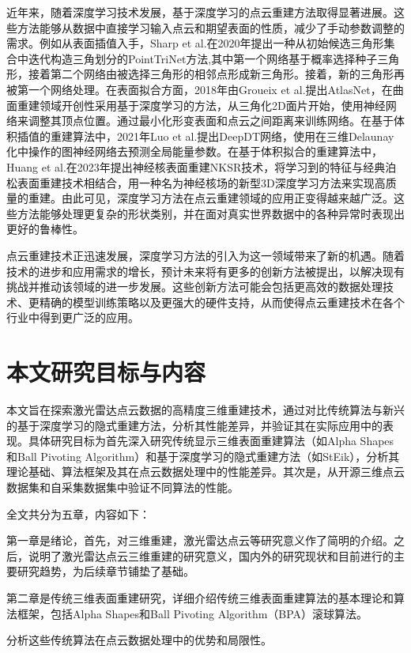 \documentclass{xduugthesis}
\begin{document}
近年来，随着深度学习技术发展，基于深度学习的点云重建方法取得显著进展。这些方法能够从数据中直接学习输入点云和期望表面的性质，减少了手动参数调整的需求。例如从表面插值入手，Sharp et al.在2020年提出一种从初始候选三角形集合中迭代构造三角划分的PointTriNet方法,其中第一个网络基于概率选择种子三角形，接着第二个网络由被选择三角形的相邻点形成新三角形。接着，新的三角形再被第一个网络处理。在表面拟合方面，2018年由Groueix et al.提出AtlasNet，在曲面重建领域开创性采用基于深度学习的方法，从三角化2D面片开始，使用神经网络来调整其顶点位置。通过最小化形变表面和点云之间距离来训练网络。在基于体积插值的重建算法中，2021年Luo et al.提出DeepDT网络，使用在三维Delaunay化中操作的图神经网络去预测全局能量参数。在基于体积拟合的重建算法中，Huang et al.在2023年提出神经核表面重建NKSR技术，将学习到的特征与经典泊松表面重建技术相结合，用一种名为神经核场的新型3D深度学习方法来实现高质量的重建。由此可见，深度学习方法在点云重建领域的应用正变得越来越广泛。这些方法能够处理更复杂的形状类别，并在面对真实世界数据中的各种异常时表现出更好的鲁棒性。

点云重建技术正迅速发展，深度学习方法的引入为这一领域带来了新的机遇。随着技术的进步和应用需求的增长，预计未来将有更多的创新方法被提出，以解决现有挑战并推动该领域的进一步发展。这些创新方法可能会包括更高效的数据处理技术、更精确的模型训练策略以及更强大的硬件支持，从而使得点云重建技术在各个行业中得到更广泛的应用。

\section{本文研究目标与内容}

本文旨在探索激光雷达点云数据的高精度三维重建技术，通过对比传统算法与新兴的基于深度学习的隐式重建方法，分析其性能差异，并验证其在实际应用中的表现。具体研究目标为首先深入研究传统显示三维表面重建算法（如Alpha Shapes和Ball Pivoting Algorithm）和基于深度学习的隐式重建方法（如StEik），分析其理论基础、算法框架及其在点云数据处理中的性能差异。其次是，从开源三维点云数据集和自采集数据集中验证不同算法的性能。 

全文共分为五章，内容如下：

第一章是绪论，首先，对三维重建，激光雷达点云等研究意义作了简明的介绍。之后，说明了激光雷达点云三维重建的研究意义，国内外的研究现状和目前进行的主要研究趋势，为后续章节铺垫了基础。

第二章是传统三维表面重建研究，详细介绍传统三维表面重建算法的基本理论和算法框架，包括Alpha Shapes和Ball Pivoting Algorithm（BPA）滚球算法。

分析这些传统算法在点云数据处理中的优势和局限性。
\end{document}
